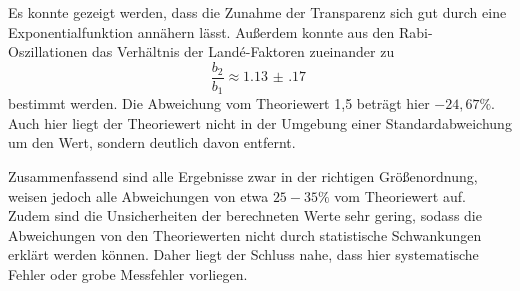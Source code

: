 Es konnte gezeigt werden, dass die Zunahme der Transparenz sich gut durch eine Exponentialfunktion
annähern lässt. Außerdem konnte aus den Rabi-Oszillationen das Verhältnis der Landé-Faktoren zueinander
zu
\begin{equation*}
  \frac{b_2}{b_1}\approx\SI{1.13(17)}{}
\end{equation*}
bestimmt werden. Die Abweichung vom Theoriewert 1{,}5 beträgt hier $-24{,}67\%$.
Auch hier liegt der Theoriewert nicht in der Umgebung einer Standardabweichung um den Wert, sondern
deutlich davon entfernt.

Zusammenfassend sind alle Ergebnisse zwar in der richtigen Größenordnung, weisen jedoch alle
Abweichungen von etwa $25-35\%$ vom Theoriewert auf. Zudem sind die Unsicherheiten der berechneten
Werte sehr gering, sodass die Abweichungen von den Theoriewerten nicht durch statistische
Schwankungen erklärt werden können. Daher liegt der Schluss nahe, dass hier systematische Fehler
oder grobe Messfehler vorliegen.
